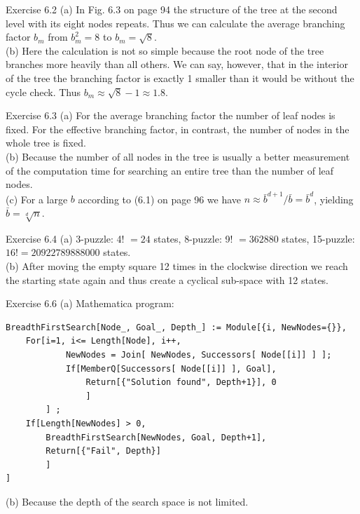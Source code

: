 \documentclass[10pt]{book}
\begin{document}
Exercise 6.2
(a) In Fig. 6.3 on page 94 the structure of the tree at the second level with its eight nodes repeats. Thus we can calculate the average branching factor $b_{m}$ from $b_{m}^{2}=8$ to $b_{m}=\sqrt{8}$.\\
(b) Here the calculation is not so simple because the root node of the tree branches more heavily than all others. We can say, however, that in the interior of the tree the branching factor is exactly 1 smaller than it would be without the cycle check. Thus $b_{m} \approx \sqrt{8}-1 \approx 1.8$.

Exercise 6.3
(a) For the average branching factor the number of leaf nodes is fixed. For the effective branching factor, in contrast, the number of nodes in the whole tree is fixed.\\
(b) Because the number of all nodes in the tree is usually a better measurement of the computation time for searching an entire tree than the number of leaf nodes.\\
(c) For a large $b$ according to (6.1) on page 96 we have $n \approx \bar{b}^{d+1} / \bar{b}=\bar{b}^{d}$, yielding $\bar{b}=\sqrt[d]{n}$.

Exercise 6.4
(a) 3-puzzle: 4! $=24$ states, 8-puzzle: 9! $=362880$ states, 15-puzzle: $16!=20922789888000$ states.\\
(b) After moving the empty square 12 times in the clockwise direction we reach the starting state again and thus create a cyclical sub-space with 12 states.

Exercise 6.6 (a) Mathematica program:

\begin{verbatim}
BreadthFirstSearch[Node_, Goal_, Depth_] := Module[{i, NewNodes={}},
    For[i=1, i<= Length[Node], i++,
            NewNodes = Join[ NewNodes, Successors[ Node[[i]] ] ];
            If[MemberQ[Successors[ Node[[i]] ], Goal],
                Return[{"Solution found", Depth+1}], 0
                ]
        ] ;
    If[Length[NewNodes] > 0,
        BreadthFirstSearch[NewNodes, Goal, Depth+1],
        Return[{"Fail", Depth}]
        ]
]
\end{verbatim}

(b) Because the depth of the search space is not limited.
\end{document}
